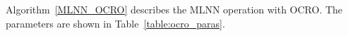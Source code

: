 \documentclass[smallcondensed, natbib]{svjour3}     %
\newcommand{\Break}{\State \textbf{break} }
\begin{document}
Algorithm~\ref{MLNN_OCRO} describes the MLNN operation with OCRO. The parameters are shown in Table~\ref{table:ocro_paras}.

%		
%  		
%	     		
%	     		
%
\end{document}
